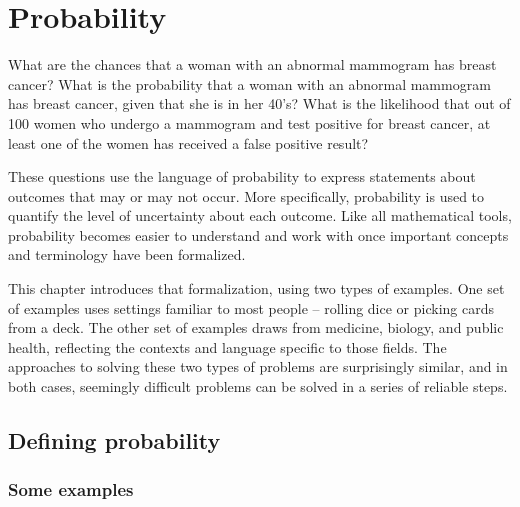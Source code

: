 
\chapter{Probability}
\label{probability}



What are the chances that a woman with an abnormal mammogram has breast cancer? What is the probability that a woman with an abnormal mammogram has breast cancer, given that she is in her 40's? What is the likelihood that out of 100 women who undergo a mammogram and test positive for breast cancer, at least one of the women has received a false positive result?

These questions use the language of probability to express statements about outcomes that may or may not occur. More specifically, probability is used to quantify the level of uncertainty about each outcome.  Like all mathematical tools, probability becomes easier to understand and work with once important concepts and terminology have been formalized. 

This chapter introduces that formalization, using two types of examples. One set of examples uses settings familiar to most people -- rolling dice or picking cards from a deck. The other set of examples draws from medicine, biology, and public health, reflecting the contexts and language specific to those fields. The approaches to solving these two types of problems are surprisingly similar, and in both cases, seemingly difficult problems can be solved in a series of reliable steps.

\section{Defining probability}
\label{basicsOfProbability}

\subsection{Some examples}

